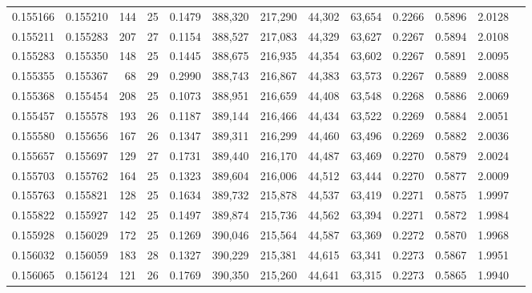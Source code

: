 \begin{tabular}{rrrrrrrrrrrrr}
0.155166 & 0.155210 & 144 &  25 &                                     0.1479 & 388,320 & 217,290 &  44,302 &  63,654 & 0.2266 & 0.5896 & 2.0128 \\
0.155211 & 0.155283 & 207 &  27 &                                     0.1154 & 388,527 & 217,083 &  44,329 &  63,627 & 0.2267 & 0.5894 & 2.0108 \\
0.155283 & 0.155350 & 148 &  25 &                                     0.1445 & 388,675 & 216,935 &  44,354 &  63,602 & 0.2267 & 0.5891 & 2.0095 \\
0.155355 & 0.155367 &  68 &  29 &                                     0.2990 & 388,743 & 216,867 &  44,383 &  63,573 & 0.2267 & 0.5889 & 2.0088 \\
0.155368 & 0.155454 & 208 &  25 &                                     0.1073 & 388,951 & 216,659 &  44,408 &  63,548 & 0.2268 & 0.5886 & 2.0069 \\
0.155457 & 0.155578 & 193 &  26 &                                     0.1187 & 389,144 & 216,466 &  44,434 &  63,522 & 0.2269 & 0.5884 & 2.0051 \\
0.155580 & 0.155656 & 167 &  26 &                                     0.1347 & 389,311 & 216,299 &  44,460 &  63,496 & 0.2269 & 0.5882 & 2.0036 \\
0.155657 & 0.155697 & 129 &  27 &                                     0.1731 & 389,440 & 216,170 &  44,487 &  63,469 & 0.2270 & 0.5879 & 2.0024 \\
0.155703 & 0.155762 & 164 &  25 &                                     0.1323 & 389,604 & 216,006 &  44,512 &  63,444 & 0.2270 & 0.5877 & 2.0009 \\
0.155763 & 0.155821 & 128 &  25 &                                     0.1634 & 389,732 & 215,878 &  44,537 &  63,419 & 0.2271 & 0.5875 & 1.9997 \\
0.155822 & 0.155927 & 142 &  25 &                                     0.1497 & 389,874 & 215,736 &  44,562 &  63,394 & 0.2271 & 0.5872 & 1.9984 \\
0.155928 & 0.156029 & 172 &  25 &                                     0.1269 & 390,046 & 215,564 &  44,587 &  63,369 & 0.2272 & 0.5870 & 1.9968 \\
0.156032 & 0.156059 & 183 &  28 &                                     0.1327 & 390,229 & 215,381 &  44,615 &  63,341 & 0.2273 & 0.5867 & 1.9951 \\
0.156065 & 0.156124 & 121 &  26 &                                     0.1769 & 390,350 & 215,260 &  44,641 &  63,315 & 0.2273 & 0.5865 & 1.9940 \\

\end{tabular}
